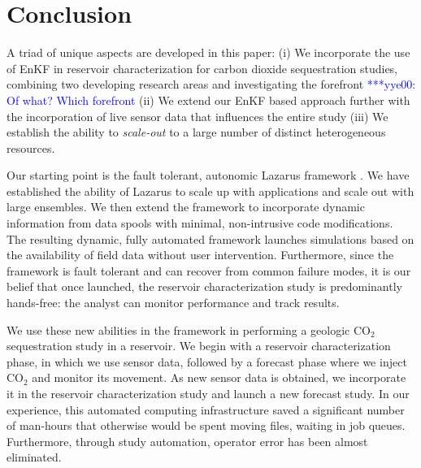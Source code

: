 \documentclass{acm_proc_article-sp}
\newcommand{\jhanote}[1]{ {\textcolor{red} { ***Jha: #1 }}}
\newcommand{\yyenote}[1]{ {\textcolor{blue} { ***yye00: #1 }}}
\newcommand{\jhanote}[1]{}
\newcommand{\yyenote}[1]{}
\begin{document}


\section{Conclusion}
A triad of unique aspects are developed in this paper: (i) We
incorporate the use of EnKF in reservoir characterization for carbon
dioxide sequestration studies, combining two developing research areas
and investigating the forefront \yyenote{Of what? Which forefront}(ii)
We extend our EnKF based approach further with the incorporation of
live sensor data that influences the entire study (iii) We establish
the ability to {\it scale-out} to a large number of distinct
heterogeneous resources.

Our starting point is the fault tolerant, autonomic Lazarus framework
\cite{gmac}. We have established the ability of Lazarus to scale up 
with applications and scale out with large ensembles. We then extend
the framework to incorporate dynamic information from data spools with
minimal, non-intrusive code modifications. The resulting dynamic, fully
automated framework launches simulations based on the availability of field
data without user intervention. Furthermore, since the framework
is fault tolerant and can recover from common failure modes, it is our
belief that once launched, the reservoir characterization study
is predominantly hands-free: the analyst can monitor performance
and track results.

We use these new abilities in the framework in performing a geologic
CO$_2$ sequestration study in a reservoir. We begin with a reservoir
characterization phase, in which we use sensor data, followed by a 
forecast phase where we inject CO$_2$ and monitor its movement. As new
sensor data is obtained, we incorporate it in the reservoir
characterization study and launch a new forecast study. In our experience,
this automated computing infrastructure saved a significant number
of  man-hours that otherwise would be spent moving files, waiting in job queues.
Furthermore, through study automation, operator error has been
almost eliminated.
\end{document}
